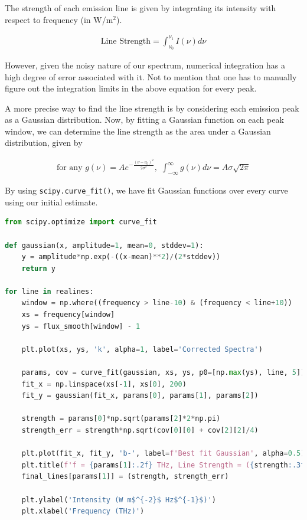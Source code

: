The strength of each emission line is given by integrating its intensity with respect to frequency (in W/m$^2$).

\begin{align}
    \text{Line Strength} = \int_{\nu_0}^{\nu_1} I(\nu) d\nu
\end{align}

However, given the noisy nature of our spectrum, numerical integration has a high degree of error associated with it. Not to mention that one has to manually figure out the integration limits in the above equation for every peak.

A more precise way to find the line strength is by considering each emission peak as a Gaussian distribution. Now, by fitting a Gaussian function on each peak window, we can determine the line strength as the area under a Gaussian distribution, given by

\begin{align}
    \text{for any } g(\nu) = Ae^{-\frac{(\nu-\nu_0)^2}{2\sigma^2}},\,\,\int_{-\infty}^{\infty} g(\nu) d\nu = A\sigma\sqrt{2\pi}
\end{align}

By using \verb|scipy.curve_fit()|, we have fit Gaussian functions over every curve using our initial estimate.

\begin{lstlisting}[language=Python, caption=Finding the peaks using a threshold value set manually]
from scipy.optimize import curve_fit 

def gaussian(x, amplitude=1, mean=0, stddev=1): 
    y = amplitude*np.exp(-((x-mean)**2)/(2*stddev)) 
    return y 
    
for line in realines:
    window = np.where((frequency > line-10) & (frequency < line+10))
    xs = frequency[window]
    ys = flux_smooth[window] - 1
    
    plt.plot(xs, ys, 'k', alpha=1, label='Corrected Spectra')
    
    params, cov = curve_fit(gaussian, xs, ys, p0=[np.max(ys), line, 5])
    fit_x = np.linspace(xs[-1], xs[0], 200)
    fit_y = gaussian(fit_x, params[0], params[1], params[2]) 
    
    strength = params[0]*np.sqrt(params[2]*2*np.pi)
    strength_err = strength*np.sqrt(cov[0][0] + cov[2][2]/4)
    
    plt.plot(fit_x, fit_y, 'b-', label=f'Best fit Gaussian', alpha=0.5)
    plt.title(f'f = {params[1]:.2f} THz, Line Strength = ({strength:.3f} '+ r"$\pm$"+ f' {strength_err:.3f}) W/m'+r"$^{2}$", fontsize=10)
    final_lines[params[1]] = (strength, strength_err)
    
    plt.ylabel('Intensity (W m$^{-2}$ Hz$^{-1}$)')
    plt.xlabel('Frequency (THz)')
\end{lstlisting}

